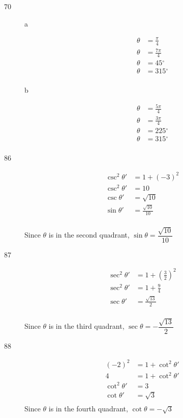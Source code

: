 \documentclass[fleqn,addpoints]{exam}
\newcommand{\degree}{\ensuremath{^\circ}}
\begin{document}
\begin{description}
\item[70]
\begin{description}
\item[a]
\begin{align*}
  \theta &= \frac{\pi}{4} \\
  \theta &= \frac{7 \pi}{4} \\
  \theta &= 45 \degree \\
  \theta &= 315 \degree \\
\end{align*}

\item[b]
\begin{align*}
  \theta &= \frac{5 \pi}{4} \\
  \theta &= \frac{3 \pi}{4} \\
  \theta &= 225 \degree \\
  \theta &= 315 \degree \\
\end{align*}

\end{description}

\item[86]
\begin{align*}
  \csc^2 \theta' &= 1 + (-3)^2 \\
  \csc^2 \theta' &= 10 \\
  \csc \theta' &= \sqrt{10} \\
  \sin \theta' &= \frac{\sqrt{10}}{10} \\
\end{align*}

Since $\theta$ is in the second quadrant, $\sin \theta = \dfrac{\sqrt{10}}{10}$

\item[87]
\begin{align*}
  \sec^2 \theta' &= 1 + \left( \frac{3}{2} \right)^2\\
  \sec^2 \theta' &= 1 + \frac{9}{4} \\
  \sec \theta' &=  \frac{\sqrt{13}}{2} \\
\end{align*}

Since $\theta$ is in the third quadrant, $\sec \theta = -\dfrac{\sqrt{13}}{2}$

\item[88]

\begin{align*}
  (-2)^2 &= 1 + \cot^2 \theta' \\
  4 &= 1 + \cot^2 \theta' \\
  \cot^2 \theta' &= 3 \\
  \cot \theta' &= \sqrt{3} \\
\end{align*}
Since $\theta$ is in the fourth quadrant, $\cot \theta = - \sqrt{3}$


\end{description}
\end{document}
